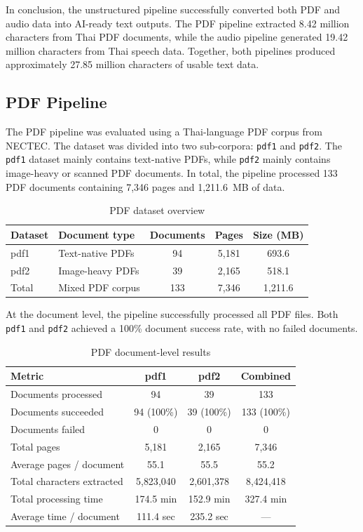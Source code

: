 \documentclass[12pt,oneside,openright,a4paper]{cpe-english-project}
\begin{document}
In conclusion, the unstructured pipeline successfully converted both PDF and audio data into AI-ready text outputs. The PDF pipeline extracted 8.42 million characters from Thai PDF documents, while the audio pipeline generated 19.42 million characters from Thai speech data. Together, both pipelines produced approximately 27.85 million characters of usable text data.

\subsection{PDF Pipeline}

The PDF pipeline was evaluated using a Thai-language PDF corpus from NECTEC. The dataset was divided into two sub-corpora: \texttt{pdf1} and \texttt{pdf2}. The \texttt{pdf1} dataset mainly contains text-native PDFs, while \texttt{pdf2} mainly contains image-heavy or scanned PDF documents. In total, the pipeline processed 133 PDF documents containing 7{,}346 pages and 1{,}211.6~MB of data.

\begin{table}[H]
\centering
\caption{PDF dataset overview}\label{tbl:pdf-overview}
\begin{tabular}{|p{}|p{}|c|c|c|}
\hline
\textbf{Dataset} & \textbf{Document type} & \textbf{Documents} & \textbf{Pages} & \textbf{Size (MB)} \\ \hline
pdf1 & Text-native PDFs & 94 & 5{,}181 & 693.6 \\ \hline
pdf2 & Image-heavy PDFs & 39 & 2{,}165 & 518.1 \\ \hline
Total & Mixed PDF corpus & 133 & 7{,}346 & 1{,}211.6 \\ \hline
\end{tabular}
\end{table}

At the document level, the pipeline successfully processed all PDF files. Both \texttt{pdf1} and \texttt{pdf2} achieved a 100\% document success rate, with no failed documents.

\begin{table}[H]
\centering
\caption{PDF document-level results}\label{tbl:pdf-doc}
\begin{tabular}{|p{}|c|c|c|}
\hline
\textbf{Metric} & \textbf{pdf1} & \textbf{pdf2} & \textbf{Combined} \\ \hline
Documents processed & 94 & 39 & 133 \\ \hline
Documents succeeded & 94 (100\%) & 39 (100\%) & 133 (100\%) \\ \hline
Documents failed & 0 & 0 & 0 \\ \hline
Total pages & 5{,}181 & 2{,}165 & 7{,}346 \\ \hline
Average pages / document & 55.1 & 55.5 & 55.2 \\ \hline
Total characters extracted & 5{,}823{,}040 & 2{,}601{,}378 & 8{,}424{,}418 \\ \hline
Total processing time & 174.5 min & 152.9 min & 327.4 min \\ \hline
Average time / document & 111.4 sec & 235.2 sec & --- \\ \hline
\end{tabular}
\end{table}
\end{document}
